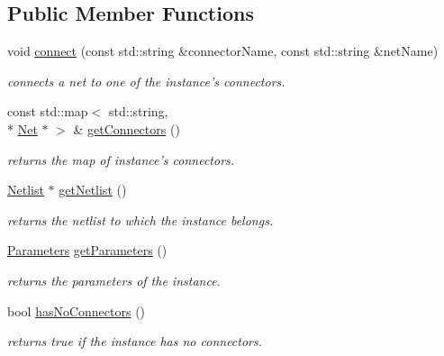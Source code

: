 \subsection*{Public Member Functions}
\begin{DoxyCompactItemize}
\item 
void \hyperlink{class_open_chams_1_1_instance_a96b4f4ce732290340f727169d2e43ee8}{connect} (const std\-::string \&connector\-Name, const std\-::string \&net\-Name)
\begin{DoxyCompactList}\small\item\em connects a net to one of the instance's connectors. \end{DoxyCompactList}\item 
\hypertarget{class_open_chams_1_1_instance_a745fe0a50eb770ce3bea36ef0e62c8ca}{const std\-::map$<$ std\-::string, \\*
\hyperlink{class_open_chams_1_1_net}{Net} $\ast$ $>$ \& \hyperlink{class_open_chams_1_1_instance_a745fe0a50eb770ce3bea36ef0e62c8ca}{get\-Connectors} ()}\label{class_open_chams_1_1_instance_a745fe0a50eb770ce3bea36ef0e62c8ca}

\begin{DoxyCompactList}\small\item\em returns the map of instance's connectors. \end{DoxyCompactList}\item 
\hypertarget{class_open_chams_1_1_instance_a4085d6a7b6958ffdd7ab5df7e6d6e53f}{\hyperlink{class_open_chams_1_1_netlist}{Netlist} $\ast$ \hyperlink{class_open_chams_1_1_instance_a4085d6a7b6958ffdd7ab5df7e6d6e53f}{get\-Netlist} ()}\label{class_open_chams_1_1_instance_a4085d6a7b6958ffdd7ab5df7e6d6e53f}

\begin{DoxyCompactList}\small\item\em returns the netlist to which the instance belongs. \end{DoxyCompactList}\item 
\hypertarget{class_open_chams_1_1_instance_a2e51ad4344607fc279c5c8cda4edae02}{\hyperlink{class_open_chams_1_1_parameters}{Parameters} \hyperlink{class_open_chams_1_1_instance_a2e51ad4344607fc279c5c8cda4edae02}{get\-Parameters} ()}\label{class_open_chams_1_1_instance_a2e51ad4344607fc279c5c8cda4edae02}

\begin{DoxyCompactList}\small\item\em returns the parameters of the instance. \end{DoxyCompactList}\item 
\hypertarget{class_open_chams_1_1_instance_a44b9dfed39a5ff0c70ec99eea6ecec1a}{bool \hyperlink{class_open_chams_1_1_instance_a44b9dfed39a5ff0c70ec99eea6ecec1a}{has\-No\-Connectors} ()}\label{class_open_chams_1_1_instance_a44b9dfed39a5ff0c70ec99eea6ecec1a}

\begin{DoxyCompactList}\small\item\em returns true if the instance has no connectors. \end{DoxyCompactList}\end{DoxyCompactItemize}


